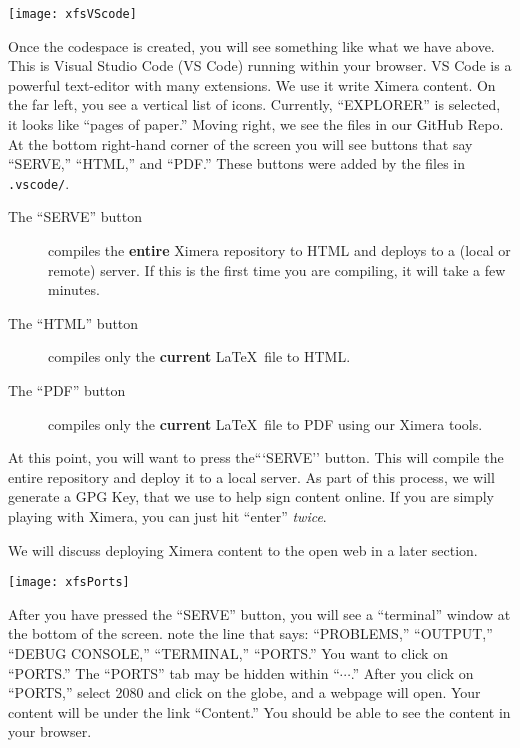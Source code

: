 \documentclass{ximera}
\begin{document}
\begin{image}
    \texttt{[image: xfsVScode]}
\end{image}
        Once the codespace is created, you will see something like what we have
        above. This is Visual Studio Code (VS Code) running within your browser. VS Code
        is a powerful text-editor with many extensions. We use it write Ximera content.
        On the far left, you see a vertical list of icons. Currently, ``EXPLORER'' is
        selected, it looks like ``pages of paper.'' Moving right, we see the files in
        our GitHub Repo. At the bottom right-hand corner of the screen you will see
        buttons that say ``SERVE,''  ``HTML,'' and ``PDF.'' These buttons were added by the files
        in \verb!.vscode/!.
        \begin{description}
            \item[The ``SERVE'' button] compiles the \textbf{entire} Ximera repository to HTML and deploys to a (local or remote) server. If this is the first time you are compiling, it will take a few minutes.
        \item[The ``HTML'' button] compiles only the \textbf{current} \LaTeX\ file to HTML.
        \item[The ``PDF'' button] compiles only the \textbf{current} \LaTeX\ file to PDF using our Ximera tools.
        \end{description}
        At this point, you will want to press the```SERVE'' button. This will
        compile the entire repository and deploy it to a local server. As part of this process, 
        we will generate a GPG Key, that we use to help sign content online. 
        If you are simply playing with Ximera, you can just hit ``enter'' \textit{twice}.



        We will discuss deploying Ximera content to the open web in a later section.
        
        \pdfOnly{\end{multicols*}}

\newpage

\begin{image}
    \texttt{[image: xfsPorts]}
\end{image}

    After you have pressed the ``SERVE'' button, you will see a
        ``terminal'' window at the bottom of the screen. 
        note the line that says: ``PROBLEMS,'' ``OUTPUT,'' ``DEBUG CONSOLE,''
        ``TERMINAL,'' ``PORTS.''
        You want
        to click on ``PORTS.'' The ``PORTS'' tab may be hidden within
        ``$\cdots$.''
        After you click on ``PORTS,'' select 2080 and click on the globe, and a
        webpage
        will open. Your
        content will be under the link ``Content.'' You should be able to see
        the
        content in your browser.
\end{document}
